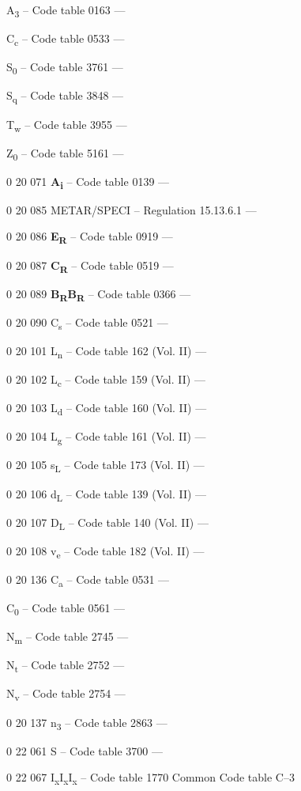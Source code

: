 A\textsubscript{3} -- Code table 0163 ---

C\textsubscript{c} -- Code table 0533 ---

S\textsubscript{0} -- Code table 3761 ---

S\textsubscript{q} -- Code table 3848 ---

T\textsubscript{w} -- Code table 3955 ---

Z\textsubscript{0} -- Code table 5161 ---

0 20 071 \textbf{A\textsubscript{i}} -- Code table 0139 ---

0 20 085 METAR/SPECI -- Regulation 15.13.6.1 ---

0 20 086 \textbf{E\textsubscript{R}} -- Code table 0919 ---

0 20 087 \textbf{C\textsubscript{R}} -- Code table 0519 ---

0 20 089 \textbf{B\textsubscript{R}B\textsubscript{R}} -- Code table 0366 ---

0 20 090 C\textsubscript{s} -- Code table 0521 ---

0 20 101 L\textsubscript{n} -- Code table 162 (Vol. II) ---

0 20 102 L\textsubscript{c} -- Code table 159 (Vol. II) ---

0 20 103 L\textsubscript{d} -- Code table 160 (Vol. II) ---

0 20 104 L\textsubscript{g} -- Code table 161 (Vol. II) ---

0 20 105 s\textsubscript{L} -- Code table 173 (Vol. II) ---

0 20 106 d\textsubscript{L} -- Code table 139 (Vol. II) ---

0 20 107 D\textsubscript{L} -- Code table 140 (Vol. II) ---

0 20 108 v\textsubscript{e} -- Code table 182 (Vol. II) ---

0 20 136 C\textsubscript{a} -- Code table 0531 ---

C\textsubscript{0} -- Code table 0561 ---

N\textsubscript{m} -- Code table 2745 ---

N\textsubscript{t} -- Code table 2752 ---

N\textsubscript{v} -- Code table 2754 ---

0 20 137 n\textsubscript{3} -- Code table 2863 ---

0 22 061 S -- Code table 3700 ---

0 22 067 I\textsubscript{x}I\textsubscript{x}I\textsubscript{x} -- Code table 1770 Common Code table C--3

